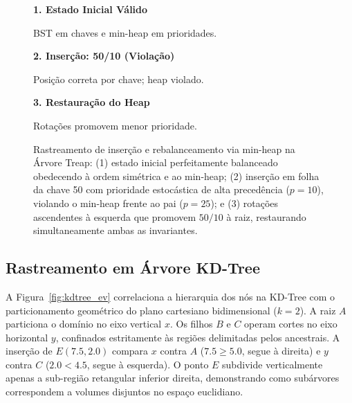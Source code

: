 \documentclass[11pt,a4paper]{article}
\begin{document}
\begin{figure}[htbp]
\centering
\begin{minipage}[t]{0.31\textwidth}
\centering\textbf{1. Estado Inicial Válido}\par\smallskip
{}
\par\tiny BST em chaves e min-heap em prioridades.
\end{minipage}\hfill
\begin{minipage}[t]{0.31\textwidth}
\centering\textbf{2. Inserção: 50/10 (Violação)}\par\smallskip
{}
\par\tiny Posição correta por chave; heap violado.
\end{minipage}\hfill
\begin{minipage}[t]{0.31\textwidth}
\centering\textbf{3. Restauração do Heap}\par\smallskip
{}
\par\tiny Rotações promovem menor prioridade.
\end{minipage}
\caption{Rastreamento de inserção e rebalanceamento via min-heap na Árvore Treap: (1) estado inicial perfeitamente balanceado obedecendo à ordem simétrica e ao min-heap; (2) inserção em folha da chave 50 com prioridade estocástica de alta precedência ($p=10$), violando o min-heap frente ao pai ($p=25$); e (3) rotações ascendentes à esquerda que promovem $50/10$ à raiz, restaurando simultaneamente ambas as invariantes.}
\label{fig:treap_ev}
\end{figure}

\subsection{Rastreamento em Árvore KD-Tree}
A Figura~\ref{fig:kdtree_ev} correlaciona a hierarquia dos nós na KD-Tree com o particionamento geométrico do plano cartesiano bidimensional ($k=2$). A raiz $A$ particiona o domínio no eixo vertical $x$. Os filhos $B$ e $C$ operam cortes no eixo horizontal $y$, confinados estritamente às regiões delimitadas pelos ancestrais. A inserção de $E(7.5, 2.0)$ compara $x$ contra $A$ ($7.5 \ge 5.0$, segue à direita) e $y$ contra $C$ ($2.0 < 4.5$, segue à esquerda). O ponto $E$ subdivide verticalmente apenas a sub-região retangular inferior direita, demonstrando como subárvores correspondem a volumes disjuntos no espaço euclidiano.
\end{document}
